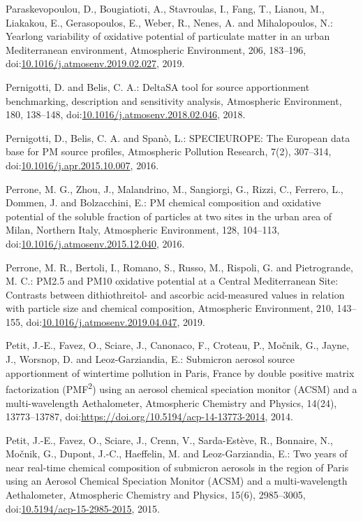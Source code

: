 \documentclass[
]{article}
\begin{document}
Paraskevopoulou, D., Bougiatioti, A., Stavroulas, I., Fang, T., Lianou,
M., Liakakou, E., Gerasopoulos, E., Weber, R., Nenes, A. and
Mihalopoulos, N.: Yearlong variability of oxidative potential of
particulate matter in an urban Mediterranean environment, Atmospheric
Environment, 206, 183--196,
doi:\href{https://doi.org/10.1016/j.atmosenv.2019.02.027}{10.1016/j.atmosenv.2019.02.027},
2019.

Pernigotti, D. and Belis, C. A.: DeltaSA tool for source apportionment
benchmarking, description and sensitivity analysis, Atmospheric
Environment, 180, 138--148,
doi:\href{https://doi.org/10.1016/j.atmosenv.2018.02.046}{10.1016/j.atmosenv.2018.02.046},
2018.

Pernigotti, D., Belis, C. A. and Spanò, L.: SPECIEUROPE: The European
data base for PM source profiles, Atmospheric Pollution Research, 7(2),
307--314,
doi:\href{https://doi.org/10.1016/j.apr.2015.10.007}{10.1016/j.apr.2015.10.007},
2016.

Perrone, M. G., Zhou, J., Malandrino, M., Sangiorgi, G., Rizzi, C.,
Ferrero, L., Dommen, J. and Bolzacchini, E.: PM chemical composition and
oxidative potential of the soluble fraction of particles at two sites in
the urban area of Milan, Northern Italy, Atmospheric Environment, 128,
104--113,
doi:\href{https://doi.org/10.1016/j.atmosenv.2015.12.040}{10.1016/j.atmosenv.2015.12.040},
2016.

Perrone, M. R., Bertoli, I., Romano, S., Russo, M., Rispoli, G. and
Pietrogrande, M. C.: PM2.5 and PM10 oxidative potential at a Central
Mediterranean Site: Contrasts between dithiothreitol- and ascorbic
acid-measured values in relation with particle size and chemical
composition, Atmospheric Environment, 210, 143--155,
doi:\href{https://doi.org/10.1016/j.atmosenv.2019.04.047}{10.1016/j.atmosenv.2019.04.047},
2019.

Petit, J.-E., Favez, O., Sciare, J., Canonaco, F., Croteau, P., Močnik,
G., Jayne, J., Worsnop, D. and Leoz-Garziandia, E.: Submicron aerosol
source apportionment of wintertime pollution in Paris, France by double
positive matrix factorization (PMF\textsuperscript{2}) using an aerosol
chemical speciation monitor (ACSM) and a multi-wavelength Aethalometer,
Atmospheric Chemistry and Physics, 14(24), 13773--13787,
doi:\href{https://doi.org/https://doi.org/10.5194/acp-14-13773-2014}{https://doi.org/10.5194/acp-14-13773-2014},
2014.

Petit, J.-E., Favez, O., Sciare, J., Crenn, V., Sarda-Estève, R.,
Bonnaire, N., Močnik, G., Dupont, J.-C., Haeffelin, M. and
Leoz-Garziandia, E.: Two years of near real-time chemical composition of
submicron aerosols in the region of Paris using an Aerosol Chemical
Speciation Monitor (ACSM) and a multi-wavelength Aethalometer,
Atmospheric Chemistry and Physics, 15(6), 2985--3005,
doi:\href{https://doi.org/10.5194/acp-15-2985-2015}{10.5194/acp-15-2985-2015},
2015.
\end{document}
